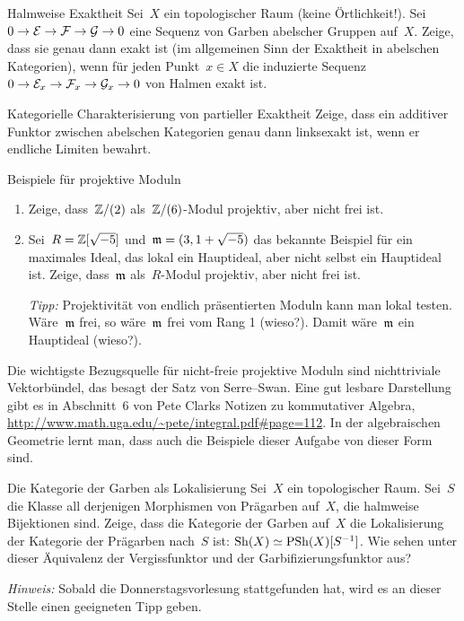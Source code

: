 \documentclass{uebblatt}
\begin{document}

\begin{aufgabe}{Halmweise Exaktheit}
Sei~$X$ ein topologischer Raum (keine Örtlichkeit!). Sei~$0 \to \mathcal{E} \to \mathcal{F} \to
\mathcal{G} \to 0$ eine Sequenz von Garben abelscher Gruppen auf~$X$. Zeige, dass sie
genau dann exakt ist (im allgemeinen Sinn der Exaktheit in abelschen
Kategorien), wenn für jeden Punkt~$x \in X$ die induzierte Sequenz~$0 \to \mathcal{E}_x
\to \mathcal{F}_x \to \mathcal{G}_x \to 0$ von Halmen exakt ist.
\end{aufgabe}

\begin{aufgabe}{Kategorielle Charakterisierung von partieller Exaktheit}
Zeige, dass ein additiver Funktor zwischen abelschen Kategorien genau dann
linksexakt ist, wenn er endliche Limiten bewahrt.
\end{aufgabe}

\begin{aufgabe}{Beispiele für projektive Moduln}
\begin{enumerate}
\item Zeige, dass~$\mathbb{Z}/(2)$ als~$\mathbb{Z}/(6)$-Modul projektiv, aber
nicht frei ist.
\item Sei~$R = \mathbb{Z}[\sqrt{-5}]$ und~$\mathfrak{m} = (3, 1+\sqrt{-5})$ das bekannte
Beispiel für ein maximales Ideal, das lokal ein Hauptideal, aber nicht selbst
ein Hauptideal ist. Zeige, dass~$\mathfrak{m}$ als~$R$-Modul projektiv, aber nicht frei
ist.

\emph{Tipp:} Projektivität von endlich präsentierten Moduln kann man lokal
testen. Wäre~$\mathfrak{m}$ frei, so wäre~$\mathfrak{m}$ frei vom Rang 1 (wieso?). Damit
wäre~$\mathfrak{m}$ ein Hauptideal (wieso?).
\end{enumerate}

Die wichtigste Bezugsquelle für nicht-freie projektive Moduln sind
nichttriviale Vektorbündel, das besagt der Satz von Serre--Swan. Eine gut
lesbare Darstellung gibt es in Abschnitt~6 von Pete Clarks Notizen zu
kommutativer Algebra, \url{http://www.math.uga.edu/~pete/integral.pdf#page=112}.
In der algebraischen Geometrie lernt man, dass auch die Beispiele dieser
Aufgabe von dieser Form sind.
\end{aufgabe}

\begin{aufgabe}{Die Kategorie der Garben als Lokalisierung}
Sei~$X$ ein topologischer Raum. Sei~$S$ die Klasse all
derjenigen Morphismen von Prägarben auf~$X$, die halmweise Bijektionen sind.
Zeige, dass die Kategorie der Garben auf~$X$ die Lokalisierung der Kategorie
der Prägarben nach~$S$ ist: $\mathrm{Sh}(X) \simeq \mathrm{PSh}(X)[S^{-1}]$. Wie sehen unter
dieser Äquivalenz der Vergissfunktor und der Garbifizierungsfunktor aus?

\emph{Hinweis:} Sobald die Donnerstagsvorlesung stattgefunden hat, wird es an
dieser Stelle einen geeigneten Tipp geben.
\end{aufgabe}
\end{document}
